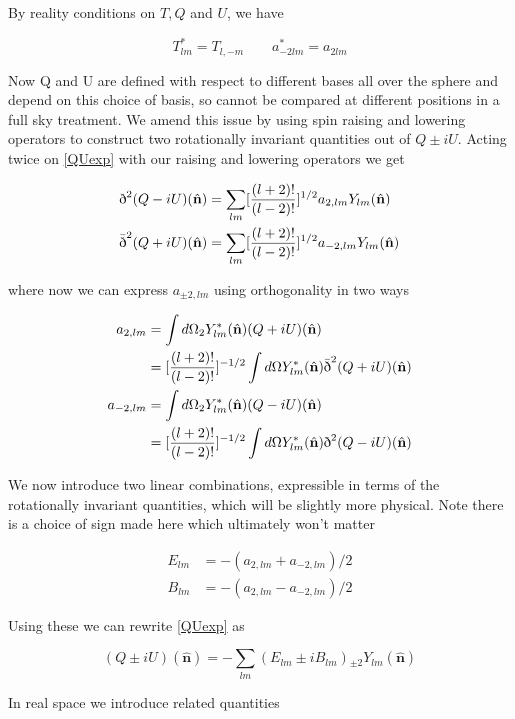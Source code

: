 \documentclass[a4paper,11pt]{article}
\renewcommand{\v}[1]{\mathbf{#1}}
\newcommand{\unit}[1]{\hat{\v{#1}}}
\newcommand{\sr}{\text{\normalfont\dh}}
\renewcommand{\sl}{\bar{\text{\normalfont\dh}}}
\newcommand{\ltwo}{[\frac{(l+2)!}{(l-2)!}]}
\begin{document}
By reality conditions on $T, Q$ and $U$, we have

\begin{equation}
T_{lm}^* = T_{l,-m} \qquad a_{-2lm}^*=a_{2lm}
\end{equation}

Now Q and U are defined with respect to different bases all over the sphere and depend on this choice of basis, so cannot be compared at different positions in a full sky treatment. We amend this issue by using spin raising and lowering operators to construct two rotationally invariant quantities out of $Q\pm iU$. Acting twice on \ref{QUexp} with our raising and lowering operators we get

\begin{align}
\sr^2(Q-iU)(\unit{n}) &= \sum_{lm} \ltwo^{1/2} a_{2,lm} {}Y_{lm}(\unit{n})\\
\sl^2(Q+iU)(\unit{n}) &= \sum_{lm} \ltwo^{1/2} a_{-2,lm} {}Y_{lm}(\unit{n})
\end{align}

where now we can express $a_{\pm2,lm}$ using orthogonality in two ways


\begin{align}
a_{2,lm} &= \int d\Omega {}_2Y_{lm}^*(\unit{n})(Q+iU)(\unit{n})\\
&= \ltwo^{-1/2}\int d\Omega Y_{lm}^*(\unit{n})\sl^2(Q+iU)(\unit{n})\\
a_{-2,lm} &= \int d\Omega {}_2Y_{lm}^*(\unit{n})(Q-iU)(\unit{n})\\
&= \ltwo^{-1/2}\int d\Omega Y_{lm}^*(\unit{n})\sr^2(Q-iU)(\unit{n})
\end{align}

We now introduce two linear combinations, expressible in terms of the rotationally invariant quantities, which will be slightly more physical. Note there is a choice of sign made here which ultimately won't matter

\begin{align} 
E_{lm} &= -(a_{2,lm} + a_{-2,lm})/2\\
B_{lm} &= -(a_{2,lm} - a_{-2,lm})/2
\end{align}

Using these we can rewrite \ref{QUexp} as 

\begin{equation}
(Q\pm iU)(\unit{n}) = -\sum_{lm} (E_{lm} \pm i B_{lm}) {}_{\pm2}Y_{lm}(\unit{n})
\label{QUEB}
\end{equation}

In real space we introduce related quantities 
\end{document}
